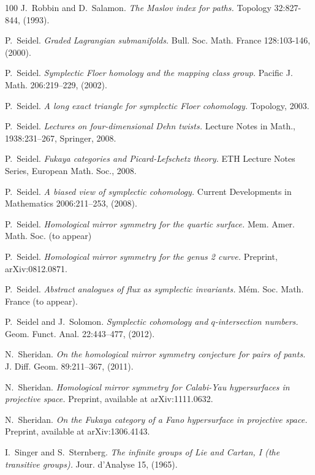 \begin{thebibliography}{100}
J.~Robbin and D.~Salamon.
\emph{The Maslov index for paths.}
Topology 32:827-844, (1993).

P.~Seidel.
\emph{Graded Lagrangian submanifolds.}
Bull. Soc. Math. France 128:103-146, (2000).

P.~Seidel.
\emph{Symplectic Floer homology and the mapping class group.}
Pacific J. Math. 206:219--229, (2002).

P.~Seidel.
\emph{A long exact triangle for symplectic Floer cohomology.}
Topology, 2003.

P.~Seidel.
\emph{Lectures on four-dimensional Dehn twists.}
Lecture Notes in Math., 1938:231--267, Springer, 2008.

P.~Seidel.
\emph{Fukaya categories and Picard-Lefschetz theory.}
ETH Lecture Notes Series, European Math. Soc., 2008.

P.~Seidel.
\emph{A biased view of symplectic cohomology.}
Current Developments in Mathematics 2006:211--253, (2008).

P.~Seidel.
\emph{Homological mirror symmetry for the quartic surface.}
Mem. Amer. Math. Soc. (to appear)

P.~Seidel.
\emph{Homological mirror symmetry for the genus 2 curve.}
Preprint, arXiv:0812.0871.

P.~Seidel.
\emph{Abstract analogues of flux as symplectic invariants.}
M\'em. Soc. Math. France (to appear).

P.~Seidel and J.~Solomon.
\emph{Symplectic cohomology and $q$-intersection numbers.}
Geom. Funct. Anal. 22:443--477, (2012).

N.~Sheridan.
\emph{On the homological mirror symmetry conjecture for pairs of pants.}
J. Diff. Geom. 89:211--367, (2011).

N.~Sheridan.
\emph{Homological mirror symmetry for Calabi-Yau hypersurfaces in projective space.}
Preprint, available at arXiv:1111.0632.

N.~Sheridan.
\emph{On the Fukaya category of a Fano hypersurface in projective space.}
Preprint, available at arXiv:1306.4143.

I.~Singer and S.~Sternberg.
\emph{The infinite groups of Lie and Cartan, I (the transitive groups).}
Jour. d'Analyse 15, (1965).


\end{thebibliography}
